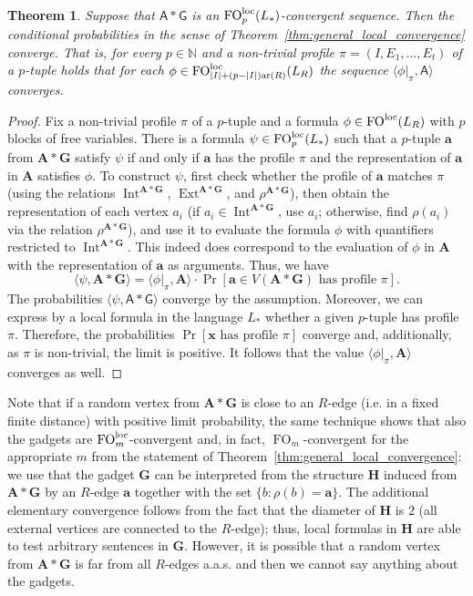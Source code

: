 \documentclass[11pt]{article}
\theoremstyle{plain}
\newtheorem{theorem}{Theorem}[section]
\theoremstyle{definition}
\theoremstyle{remark}
\DeclareMathOperator\aritysym{ar}
\newcommand{\arity}[1]{{\aritysym({#1})}}
\newcommand{\N}{\mathbb{N}}
\DeclareMathOperator\FO{FO}
\newcommand{\FOloc}[1]{\FO_{#1}^\textnormal{loc}}
\newcommand{\stonepar}[2]{\langle #1, #2 \rangle}
\newcommand{\str}[1]{\mathbf{#1}}
\newcommand{\strseq}[1]{{\boldsymbol{\mathsf{#1}}}}
\newcommand{\tpl}[1]{{\bm{#1}}}
\DeclareMathOperator\Int{Int}
\DeclareMathOperator\Ext{Ext}
\begin{document}
\begin{theorem}\label{thm:inverse_for_construction_language}
    Suppose that $\strseq{A}*\strseq{G}$ is an $\FOloc{p}(L_*)$-convergent sequence.
    Then the conditional probabilities in the sense of Theorem~\ref{thm:general_local_convergence} converge.
    That is, for every $p \in \N$ and a non-trivial profile $\pi = (I,E_1, \dots, E_t)$ of a $p$-tuple holds that for each $\phi \in \FOloc{|I|+(p-|I|)\arity{R}}(L_R)$ the sequence $\stonepar{\phi|_\pi}{\strseq{A}}$ converges.
\end{theorem}
\begin{proof}
    Fix a non-trivial profile $\pi$ of a $p$-tuple and a formula $\phi \in \FOloc{}(L_R)$ with $p$ blocks of free variables.
    There is a formula $\psi \in \FOloc{p}(L_*)$ such that a $p$-tuple $\tpl{a}$ from $\str{A}*\str{G}$ satisfy $\psi$ if and only if $\tpl{a}$ has the profile $\pi$ and the representation of $\tpl{a}$ in $\str{A}$ satisfies $\phi$.
    To construct $\psi$, first check whether the profile of $\tpl{a}$ matches $\pi$ (using the relations $\Int^{\str{A}*\str{G}}$, $\Ext^{\str{A}*\str{G}}$, and $\rho^{\str{A}*\str{G}}$), then obtain the representation of each vertex $a_i$ (if $a_i \in \Int^{\str{A}*\str{G}}$, use $a_i$; otherwise, find $\rho(a_i)$ via the relation $\rho^{\str{A}*\str{G}}$), and use it to evaluate the formula $\phi$ with quantifiers restricted to $\Int^{\str{A}*\str{G}}$.
    This indeed does correspond to the evaluation of $\phi$ in $\str{A}$ with the representation of $\tpl{a}$ as arguments.
    Thus, we have
    \[
        \stonepar{\psi}{\str{A}*\str{G}} = \stonepar{\phi|_\pi}{\str{A}} \cdot \Pr[\tpl{a} \in V(\str{A}*\str{G}) \text{ has profile } \pi]
        .
    \]
    The probabilities $\stonepar{\psi}{\strseq{A}*\strseq{G}}$ converge by the assumption.
    Moreover, we can express by a local formula in the language $L_*$ whether a given $p$-tuple has profile $\pi$.
    Therefore, the probabilities $\Pr[\tpl{x} \text{ has profile } \pi]$ converge and, additionally, as $\pi$ is non-trivial, the limit is positive.
    It follows that the value $\stonepar{\phi|_\pi}{\str{A}}$ converges as well.
\end{proof}

Note that if a random vertex from $\str{A}*\str{G}$ is close to an $R$-edge (i.e. in a fixed finite distance) with positive limit probability, the same technique shows that also the gadgets are $\FOloc{m}$-convergent and, in fact, $\FO_m$-convergent for the appropriate $m$ from the statement of Theorem~\ref{thm:general_local_convergence}:
we use that the gadget $\str{G}$ can be interpreted from the structure $\str{H}$ induced from $\str{A}*\str{G}$ by an $R$-edge $\tpl{a}$ together with the set $\{b: \rho(b) = \tpl{a}\}$.
The additional elementary convergence follows from the fact that the diameter of $\str{H}$ is $2$ (all external vertices are connected to the $R$-edge); thus, local formulas in $\str{H}$ are able to test arbitrary sentences in $\str{G}$.
However, it is possible that a random vertex from $\str{A}*\str{G}$ is far from all $R$-edges a.a.s. and then we cannot say anything about the gadgets.
\end{document}
